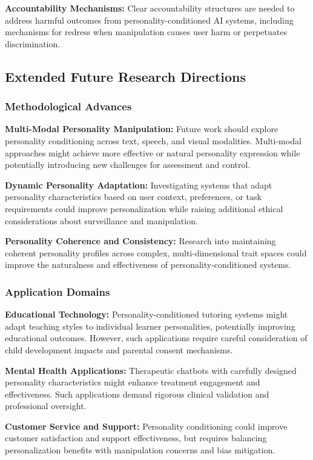 \textbf{Accountability Mechanisms:} Clear accountability structures are needed to address harmful outcomes from personality-conditioned AI systems, including mechanisms for redress when manipulation causes user harm or perpetuates discrimination.

\subsection{Extended Future Research Directions}

\subsubsection{Methodological Advances}

\textbf{Multi-Modal Personality Manipulation:} Future work should explore personality conditioning across text, speech, and visual modalities. Multi-modal approaches might achieve more effective or natural personality expression while potentially introducing new challenges for assessment and control.

\textbf{Dynamic Personality Adaptation:} Investigating systems that adapt personality characteristics based on user context, preferences, or task requirements could improve personalization while raising additional ethical considerations about surveillance and manipulation.

\textbf{Personality Coherence and Consistency:} Research into maintaining coherent personality profiles across complex, multi-dimensional trait spaces could improve the naturalness and effectiveness of personality-conditioned systems.

\subsubsection{Application Domains}

\textbf{Educational Technology:} Personality-conditioned tutoring systems might adapt teaching styles to individual learner personalities, potentially improving educational outcomes. However, such applications require careful consideration of child development impacts and parental consent mechanisms.

\textbf{Mental Health Applications:} Therapeutic chatbots with carefully designed personality characteristics might enhance treatment engagement and effectiveness. Such applications demand rigorous clinical validation and professional oversight.

\textbf{Customer Service and Support:} Personality conditioning could improve customer satisfaction and support effectiveness, but requires balancing personalization benefits with manipulation concerns and bias mitigation.

